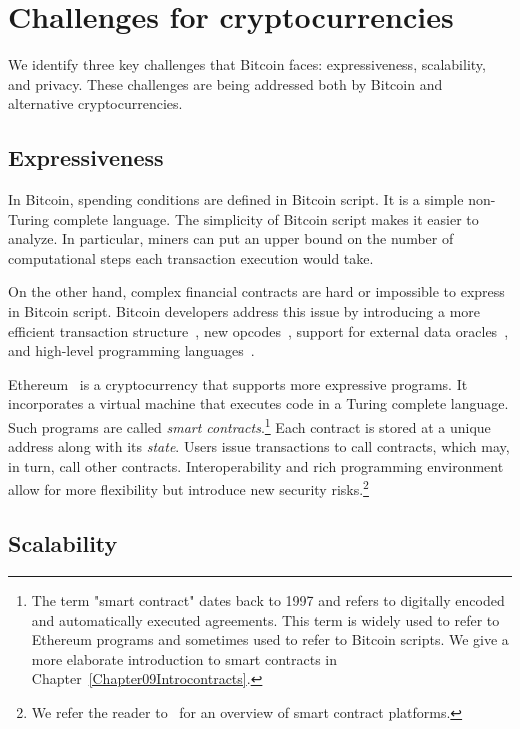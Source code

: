 \section{Challenges for cryptocurrencies}

We identify three key challenges that Bitcoin faces: expressiveness, scalability, and privacy.
These challenges are being addressed both by Bitcoin and alternative cryptocurrencies.


\subsection{Expressiveness}

In Bitcoin, spending conditions are defined in Bitcoin script.
It is a simple non-Turing complete language.
The simplicity of Bitcoin script makes it easier to analyze.
In particular, miners can put an upper bound on the number of computational steps each transaction execution would take.

On the other hand, complex financial contracts are hard or impossible to express in Bitcoin script.
Bitcoin developers address this issue by introducing a more efficient transaction structure~\cite{Wuille2020}, new opcodes~\cite{Rubin2020}, support for external data oracles~\cite{Dryja}, and high-level programming languages~\cite{OConnor2017, Wuille2019}.

Ethereum~\cite{Buterin2014, Wood2014} is a cryptocurrency that supports more expressive programs.
It incorporates a virtual machine that executes code in a Turing complete language.
Such programs are called \textit{smart contracts}.\footnote{The term "smart contract" dates back to 1997 and refers to digitally encoded and automatically executed agreements. This term is widely used to refer to Ethereum programs and sometimes used to refer to Bitcoin scripts. We give a more elaborate introduction to smart contracts in Chapter~\ref{Chapter09Introcontracts}.}
Each contract is stored at a unique address along with its \textit{state}.
Users issue transactions to call contracts, which may, in turn, call other contracts.
Interoperability and rich programming environment allow for more flexibility but introduce new security risks.\footnote{We refer the reader to~\cite{Bartoletti2017} for an overview of smart contract platforms.}


\subsection{Scalability}

